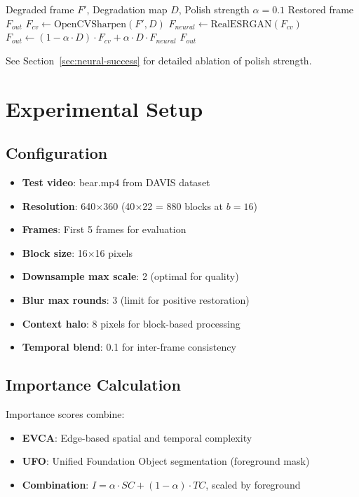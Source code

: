 \documentclass[11pt,a4paper]{article}
\begin{document}
\begin{algorithm}[H]
\caption{OpenCV + Neural Polish (Hybrid Restoration)}
\begin{algorithmic}[1]
\Require Degraded frame $F'$, Degradation map $D$, Polish strength $\alpha = 0.1$
\Ensure Restored frame $F_{out}$
\State $F_{cv} \gets \text{OpenCVSharpen}(F', D)$ 
\State $F_{neural} \gets \text{RealESRGAN}(F_{cv})$ 
\State $F_{out} \gets (1 - \alpha \cdot D) \cdot F_{cv} + \alpha \cdot D \cdot F_{neural}$ 
\State \Return $F_{out}$
\end{algorithmic}
\end{algorithm}

See Section~\ref{sec:neural-success} for detailed ablation of polish strength.

\section{Experimental Setup}

\subsection{Configuration}
\begin{itemize}
    \item \textbf{Test video}: bear.mp4 from DAVIS dataset
    \item \textbf{Resolution}: 640$\times$360 (40$\times$22 = 880 blocks at $b=16$)
    \item \textbf{Frames}: First 5 frames for evaluation
    \item \textbf{Block size}: 16$\times$16 pixels
    \item \textbf{Downsample max scale}: 2 (optimal for quality)
    \item \textbf{Blur max rounds}: 3 (limit for positive restoration)
    \item \textbf{Context halo}: 8 pixels for block-based processing
    \item \textbf{Temporal blend}: 0.1 for inter-frame consistency
\end{itemize}

\subsection{Importance Calculation}
Importance scores combine:
\begin{itemize}
    \item \textbf{EVCA}: Edge-based spatial and temporal complexity
    \item \textbf{UFO}: Unified Foundation Object segmentation (foreground mask)
    \item \textbf{Combination}: $I = \alpha \cdot SC + (1-\alpha) \cdot TC$, scaled by foreground
\end{itemize}
\end{document}
